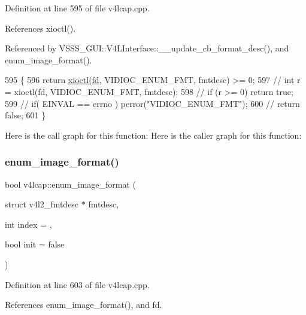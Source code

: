Definition at line 595 of file v4lcap.\+cpp.



References xioctl().



Referenced by V\+S\+S\+S\+\_\+\+G\+U\+I\+::\+V4\+L\+Interface\+::\+\_\+\+\_\+update\+\_\+cb\+\_\+format\+\_\+desc(), and enum\+\_\+image\+\_\+format().


\begin{DoxyCode}
595                                                                     \{
596     \textcolor{keywordflow}{return} \hyperlink{classv4lcap_ab5aaa5a8c0df17f5ca57e0b5170232cb}{xioctl}(\hyperlink{classv4lcap_a38109593bde997dad13b3a461569573d}{fd}, VIDIOC\_ENUM\_FMT, fmtdesc) >= 0;
597 \textcolor{comment}{//      int r = xioctl(fd, VIDIOC\_ENUM\_FMT, fmtdesc);}
598 \textcolor{comment}{//      if (r >= 0) return true;}
599 \textcolor{comment}{//      if( EINVAL == errno ) perror("VIDIOC\_ENUM\_FMT");}
600 \textcolor{comment}{//      return false;}
601 \}
\end{DoxyCode}
Here is the call graph for this function\+:
Here is the caller graph for this function\+:
\mbox{\label{classv4lcap_aafc2292c8ca86a45d42874ed4ca1c467}} 
\subsubsection{\texorpdfstring{enum\+\_\+image\+\_\+format()}{enum\_image\_format()}\hspace{0.1cm}{\footnotesize\ttfamily [2/2]}}
{\footnotesize\ttfamily bool v4lcap\+::enum\+\_\+image\+\_\+format (\begin{DoxyParamCaption}\item[{struct v4l2\+\_\+fmtdesc $\ast$}]{fmtdesc,  }\item[{int}]{index = {},  }\item[{bool}]{init = {\ttfamily false} }\end{DoxyParamCaption})}



Definition at line 603 of file v4lcap.\+cpp.



References enum\+\_\+image\+\_\+format(), and fd.



